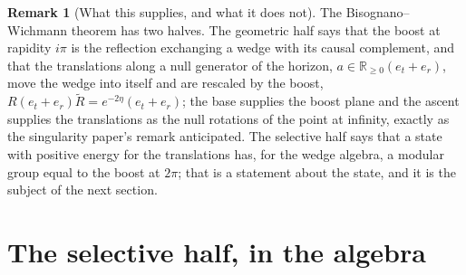\documentclass[11pt]{article}
\theoremstyle{definition}
\newtheorem{remark}[theorem]{Remark}
\theoremstyle{plain}
\providecommand{\R}{}\renewcommand{\R}{\mathbb{R}}
\begin{document}
\begin{remark}[What this supplies, and what it does not]\label{c:note.angle.what-supplies-what-it-does-not}
The Bisognano--Wichmann theorem has two halves. The geometric half says that the boost at rapidity $i\pi$ is the reflection exchanging a wedge with its causal complement, and that the translations along a null generator of the horizon, $a \in \R_{\geq 0}(e_{t} + e_{r})$, move the wedge into itself and are rescaled by the boost, $R(e_{t} + e_{r})\widetilde{R} = e^{-2\eta}(e_{t} + e_{r})$; the base supplies the boost plane and the ascent supplies the translations as the null rotations of the point at infinity, exactly as the singularity paper's remark anticipated. The selective half says that a state with positive energy for the translations has, for the wedge algebra, a modular group equal to the boost at $2\pi$; that is a statement about the state, and it is the subject of the next section.
\end{remark}

\section{The selective half, in the algebra}
\end{document}
